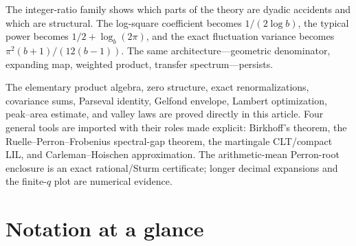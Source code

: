 \documentclass[11pt,oneside]{article}
\numberwithin{equation}{section}
\theoremstyle{definition}
\theoremstyle{remark}
\begin{document}
The integer-ratio family shows which parts of the theory are dyadic accidents and which are
structural.  The log-square coefficient becomes \(1/(2\log b)\), the typical power becomes
\(1/2+\log_b(2\pi)\), and the exact fluctuation variance becomes
\(\pi^2(b+1)/(12(b-1))\).  The same architecture---geometric denominator, expanding map,
weighted product, transfer spectrum---persists.

\begin{statusbox}
The elementary product algebra, zero structure, exact renormalizations, covariance sums,
Parseval identity, Gelfond envelope, Lambert optimization, peak--area estimate, and valley
laws are proved directly in this article.  Four general tools are imported with their roles
made explicit: Birkhoff's theorem, the Ruelle--Perron--Frobenius spectral-gap theorem, the
martingale CLT/compact LIL, and Carleman--Hoischen approximation.  The
arithmetic-mean Perron-root enclosure is an exact rational/Sturm certificate; longer decimal
expansions and the finite-\(q\) plot are numerical evidence.
\end{statusbox}

\appendix

\section{Notation at a glance}
\label{app:notation}
\end{document}
